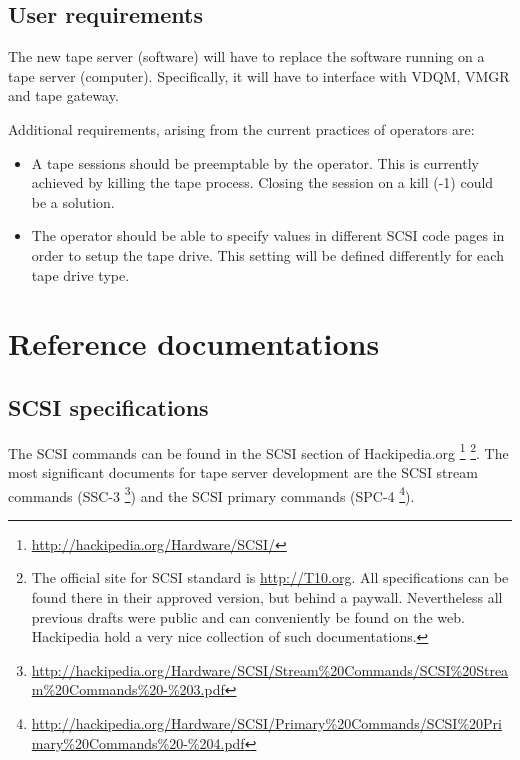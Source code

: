\subsection{User requirements}

The new tape server (software) will have to replace the software running on a tape server
(computer). Specifically, it will have to interface with VDQM, VMGR and tape gateway.

Additional requirements, arising from the current practices of operators are:

\begin{itemize}
\item{}A tape sessions should be preemptable by the operator. This is currently achieved 
by killing the tape process. Closing the session on a kill (-1) could be a solution.
\item{}The operator should be able to specify values in different SCSI code pages in
order to setup the tape drive. This setting will be defined differently for each tape
drive type.
\end{itemize}


\section{Reference documentations}
\subsection{SCSI specifications}

The SCSI commands can be found in the SCSI section of Hackipedia.org
      \footnote{ \href{http://hackipedia.org/Hardware/SCSI/}{http://hackipedia.org/Hardware/SCSI/} }
      \footnote{The official site for SCSI standard is \href{http://T10.org}{http://T10.org}. All specifications
      can be found there in their approved version, but behind a paywall. Nevertheless all previous drafts were
      public and can conveniently be found on the web. Hackipedia hold a very nice collection of such
      documentations.}.
 The most significant documents for tape server development are the SCSI stream commands (SSC-3
      \footnote{ \href{http://hackipedia.org/Hardware/SCSI/Stream\%20Commands/SCSI\%20Stream\%20Commands\%20-\%203.pdf}
                      {http://hackipedia.org/Hardware/SCSI/Stream\%20Commands/SCSI\%20Stream\%20Commands\%20-\%203.pdf} })
 and the SCSI primary commands (SPC-4
      \footnote{ \href{http://hackipedia.org/Hardware/SCSI/Primary\%20Commands/SCSI\%20Primary\%20Commands\%20-\%204.pdf}
                      {http://hackipedia.org/Hardware/SCSI/Primary\%20Commands/SCSI\%20Primary\%20Commands\%20-\%204.pdf} }).

